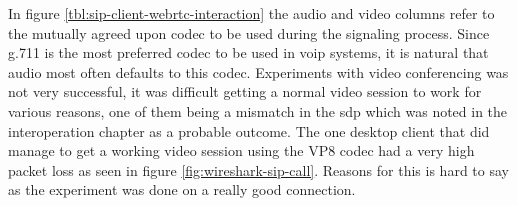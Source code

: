 \begin{table}[h]
\caption{SIP desktop client interaction with web client using proxy and RTCWEB}
\label{tbl:sip-client-webrtc-interaction}
\end{table}

In figure \ref{tbl:sip-client-webrtc-interaction} the audio and video columns refer to the mutually agreed upon codec to be used during the signaling process. Since g.711 is the most preferred codec to be used in \gls{voip} systems, it is natural that audio most often defaults to this codec. Experiments with video conferencing was not very successful, it was difficult getting a normal video session to work for various reasons, one of them being a mismatch in the \gls{sdp} which was noted in the interoperation chapter as a probable outcome. The one desktop client that did manage to get a working video session using the VP8 codec had a very high packet loss as seen in figure \ref{fig:wireshark-sip-call}. Reasons for this is hard to say as the experiment was done on a really good connection.

